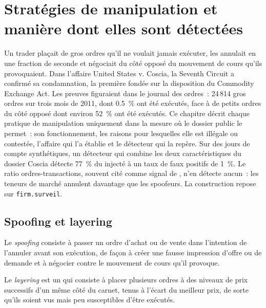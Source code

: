 \chapter{Stratégies de manipulation et manière dont elles sont détectées}\label{ch:s2:manipulative-strategies-and-how-they-are-caught}

Un trader plaçait de gros ordres qu'il ne voulait jamais exécuter, les annulait en une fraction de seconde et négociait du côté opposé du mouvement de cours
qu'ils provoquaient. Dans l'affaire United States v. Coscia, la Seventh Circuit a confirmé sa condamnation, la première fondée sur la disposition  du Commodity Exchange Act.
Les preuves figuraient dans le journal des ordres~: 24\,814 gros ordres sur trois mois de 2011, dont 0.5~\% ont été exécutés, face à de petits ordres du côté opposé dont
environ 52~\% ont été exécutés. Ce chapitre décrit chaque pratique de manipulation uniquement dans la mesure où le dossier public le permet~: son fonctionnement, les raisons pour lesquelles elle est illégale ou
contestée, l'affaire qui l'a établie et le détecteur qui la repère. Sur des jours de compte synthétiques, un détecteur qui combine les deux caractéristiques du
dossier Coscia détecte 77~\% du  injecté à un taux de faux positifs de 1~\%. Le ratio ordres-transactions, souvent cité comme signal de , n'en détecte aucun~:
les teneurs de marché annulent davantage que les spoofeurs. La construction repose sur \texttt{firm.surveil}.

\section{Spoofing et layering}

\begin{definition}[Spoofing]\label{def:s2:manipulative-strategies-and-how-they-are-caught:spoofing}
Le \emph{spoofing} consiste à passer un ordre d'achat ou de vente dans l'intention de l'annuler avant son exécution, de façon à créer une
fausse impression d'offre ou de demande et à négocier contre le mouvement de cours qu'il provoque.
\end{definition}

\begin{definition}[Layering]\label{def:s2:manipulative-strategies-and-how-they-are-caught:layering}
Le \emph{layering} est un  qui consiste à placer plusieurs ordres à des niveaux de prix successifs d'un même côté du carnet, tenus à l'écart du meilleur
prix, de sorte qu'ils soient vus mais peu susceptibles d'être exécutés.
\end{definition}

